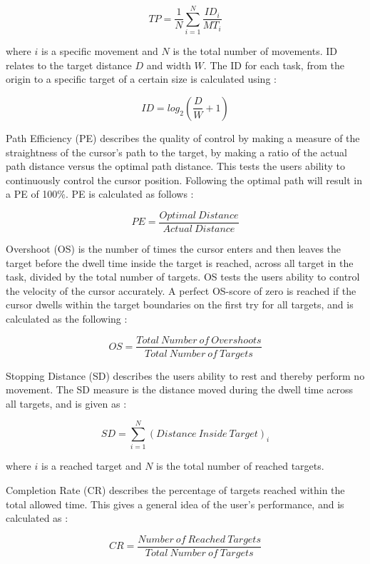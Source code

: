 \begin{equation} \label{eq:TP}
TP=\frac{1}{N}\sum_{i=1}^{N} \frac{ID_i}{MT_i} 
\end{equation}

where $i$ is a specific movement and $N$ is the total number of movements. ID relates to the target distance $D$ and width $W$. The ID for each task, from the origin to a specific target of a certain size is calculated using \cite{Scheme2013,Fitts1954}:

\begin{equation} \label{eq:ID}
ID=log_2(\frac{D}{W}+1)
\end{equation}

Path Efficiency (PE) describes the quality of control by making a measure of the straightness of the cursor's path to the target, by making a ratio of the actual path distance versus the optimal path distance. This tests the users ability to continuously control the cursor position. Following the optimal path will result in a PE of 100\%. PE is calculated as follows \cite{Scheme2013, Poulton2013}:       

\begin{equation} \label{eq:PE}
PE = \frac{Optimal ~ Distance}{Actual ~ Distance}
\end{equation}		 

Overshoot (OS) is the number of times the cursor enters and then leaves the target before the dwell time inside the target is reached, across all target in the task, divided by the total number of targets. OS tests the users ability to control the velocity of the cursor accurately. A perfect OS-score of zero is reached if the cursor dwells within the target boundaries on the first try for all targets, and is calculated as the following \cite{Scheme2013, Poulton2013}:

\begin{equation} \label{eq:OS}
OS = \frac{Total ~ Number ~ of ~ Overshoots}{Total ~ Number ~ of ~ Targets}
\end{equation}

Stopping Distance (SD) describes the users ability to rest and thereby perform no movement. The SD measure is the distance moved during the dwell time across all targets, and is given as \cite{Scheme2013}:

\begin{equation} \label{eq:SD}
SD = \sum_{i=1}^{N} (Distance ~ Inside ~ Target)_i
\end{equation}

where $i$ is a reached target and $N$ is the total number of reached targets.

Completion Rate (CR) describes the percentage of targets reached within the total allowed time. This gives a general idea of the user's performance, and is calculated as \cite{Scheme2013,Simon2011}: 

\begin{equation} \label{eq:CR}
CR = \frac{Number ~ of ~ Reached ~ Targets}{Total ~ Number ~ of ~ Targets}
\end{equation}
